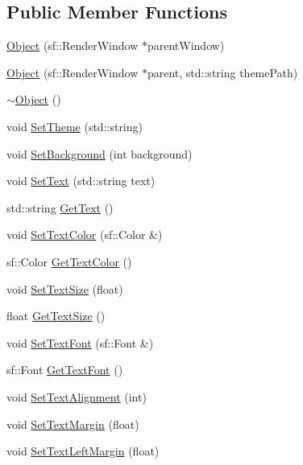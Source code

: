 \subsection*{Public Member Functions}
\begin{CompactItemize}
\item 
\hyperlink{classsfgui_1_1Object_f03d0a10a3f8f71c58f56cf896e95f82}{Object} (sf::RenderWindow $\ast$parentWindow)
\item 
\hyperlink{classsfgui_1_1Object_6d0f96eda1f89ba15d34471cfa42a0e4}{Object} (sf::RenderWindow $\ast$parent, std::string themePath)
\item 
\hyperlink{classsfgui_1_1Object_7d923592a63a854c77ce4edcb21e40ba}{$\sim$Object} ()
\item 
void \hyperlink{classsfgui_1_1Object_96e00c4db6358d27ad806c0053e343a1}{SetTheme} (std::string)
\item 
void \hyperlink{classsfgui_1_1Object_b3477443fde0d86be5e32f5c1dcd7b01}{SetBackground} (int background)
\item 
void \hyperlink{classsfgui_1_1Object_64c05d85588778a652d11c7a1daf8db0}{SetText} (std::string text)
\item 
std::string \hyperlink{classsfgui_1_1Object_070ede7cda0e7b3cab312aac5013a206}{GetText} ()
\item 
void \hyperlink{classsfgui_1_1Object_88f1c97f50dd466417309f0776dce452}{SetTextColor} (sf::Color \&)
\item 
sf::Color \hyperlink{classsfgui_1_1Object_df734af2a7ca4ad600fe8bff51ed06cc}{GetTextColor} ()
\item 
void \hyperlink{classsfgui_1_1Object_01fb5dcac8bac061999ce661d13f296e}{SetTextSize} (float)
\item 
float \hyperlink{classsfgui_1_1Object_a6fae4cfa68982563c49b8b13b11966b}{GetTextSize} ()
\item 
void \hyperlink{classsfgui_1_1Object_41801231361e4866d99ce7d4ef32e53d}{SetTextFont} (sf::Font \&)
\item 
sf::Font \hyperlink{classsfgui_1_1Object_5f1d579d8ebba512fb983622552fe40f}{GetTextFont} ()
\item 
void \hyperlink{classsfgui_1_1Object_191bba44abbc751fd80e6f19ad6aba5b}{SetTextAlignment} (int)
\item 
void \hyperlink{classsfgui_1_1Object_f71c39eb2dfd2eb76e9be9e5dad606d9}{SetTextMargin} (float)
\item 
void \hyperlink{classsfgui_1_1Object_28408aa0cf50c8da37a79215755c01d9}{SetTextLeftMargin} (float)
\item 

\end{CompactItemize}

